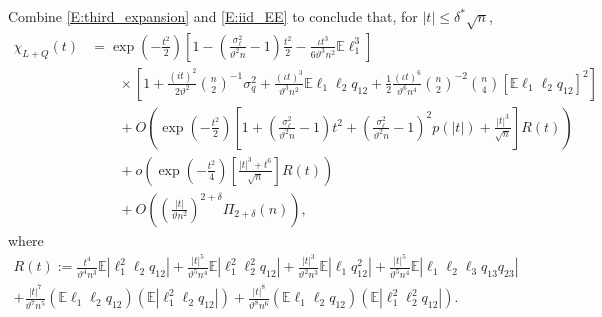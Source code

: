 \documentclass[11pt]{article}
\numberwithin{equation}{section}
\theoremstyle{definition}
\newcommand{\E}{\mathbb{E}}
\newcommand{\Scale}{\vartheta}
\begin{document}
Combine \eqref{E:third_expansion} and \eqref{E:iid_EE} to conclude that, for $|t|\leq \delta^*\sqrt{n}$,
\begin{align}\label{E:L+Q_expansion}
    \chi_{L+Q}(t)
    &=  \exp\left(-\tfrac{t^2}{2}\right)\left[1 - \left(\tfrac{\sigma_\ell^2}{\Scale^2 n}-1\right)\frac{t^2}{2} -\frac{\iota t^3}{6\Scale^3n^2}\E \ell_1^3 \right] \nonumber\\
    &\qquad \times\left[1 + \frac{(it)^2}{2\Scale^2} \binom{n}{2}^{-1}\sigma_q^2 + \frac{(\iota t)^3}{\Scale^3 n^2}\E\ell_1\ell_2q_{12} + \tfrac{1}{2}\tfrac{(\iota t)^6}{\Scale^6n^4}\binom{n}{2}^{-2}\binom{n}{4} \left[\E\ell_1\ell_2q_{12}\right]^ 2\right]\nonumber\\
    &\qquad + O\left( \exp\left(-\tfrac{t^2}{2}\right)\left[1 +\left(\tfrac{\sigma_\ell^2}{\Scale^2 n} -1\right) t^2 + \left(\tfrac{\sigma_\ell^2}{\Scale^2 n} -1\right)^2 p(|t|) +\tfrac{|t|^3}{\sqrt{n}} \right] R(t)\right)\nonumber\\
    &\qquad + o\left( \exp\left(-\tfrac{t^2}{4}\right)\left[ \tfrac{|t|^3 + t^6}{\sqrt{n}} \right] R(t)\right)\nonumber\\
    &\qquad + O\left(\left(\tfrac{|t|}{\Scale n^2}\right)^{2+\delta}\Pi_{2+\delta}(n)\right),
\end{align}
where
\begin{align*}
    R(t):=\tfrac{t^4}{\Scale^4n^3}\E|\ell_1^2\ell_2q_{12}| + \tfrac{|t|^5}{\Scale^5n^4}\E|\ell_1^2\ell_2^2q_{12}| + \tfrac{|t|^3}{\Scale^2 n^3}\E|\ell_1 q_{12}^2| + \tfrac{|t|^5}{\Scale^5 n^4}\E |\ell_1\ell_2\ell_3q_{13}q_{23}| \\+ \tfrac{|t|^7}{\Scale^7n^5}(\E\ell_1\ell_2q_{12})(\E|\ell_1^2\ell_2q_{12}|)+ \tfrac{|t|^8}{\Scale^8n^6}(\E\ell_1\ell_2q_{12})(\E|\ell_1^2\ell_2^2q_{12}|).
\end{align*}
\end{document}
